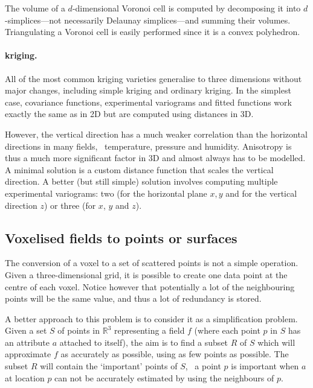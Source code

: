 The volume of a $d$-dimensional Voronoi cell is computed by decomposing it into $d$-simplices---not necessarily Delaunay simplices---and summing their volumes. 
Triangulating a Voronoi cell is easily performed since it is a convex polyhedron.

\paragraph{kriging.}
All of the most common kriging varieties generalise to three dimensions without major changes, including simple kriging and ordinary kriging.
In the simplest case, covariance functions, experimental variograms and fitted functions work exactly the same as in 2D but are computed using distances in 3D.

However, the vertical direction has a much weaker correlation than the horizontal directions in many fields, \eg\ temperature, pressure and humidity.
Anisotropy is thus a much more significant factor in 3D and almost always has to be modelled.
A minimal solution is a custom distance function that scales the vertical direction.
A better (but still simple) solution involves computing multiple experimental variograms: two (for the horizontal plane \(x,y\) and for the vertical direction \(z\)) or three (for \(x\), \(y\) and \(z\)).

\subsection{Voxelised fields to points or surfaces}

The conversion of a voxel to a set of scattered points is not a simple operation.
Given a three-dimensional grid, it is possible to create one data point at the centre of each voxel.
Notice however that potentially a lot of the neighbouring points will be the same value, and thus a lot of redundancy is stored.

%

A better approach to this problem is to consider it as a simplification problem.%
Given a set $S$ of points in $\mathbb{R}^3$ representing a field $f$ (where each point $p$ in $S$ has an attribute $a$ attached to itself), the aim is to find a subset $R$ of $S$ which will approximate $f$ as accurately as possible, using as few points as possible. 
The subset $R$ will contain the `important' points of $S$, \ie\ a point $p$ is important when $a$ at location $p$ can not be accurately estimated by using the neighbours of $p$.

